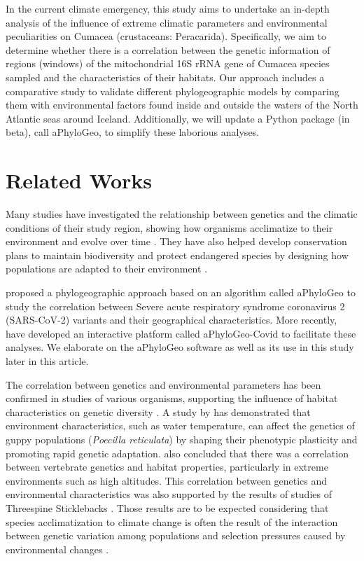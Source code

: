 In the current climate emergency, this study aims to undertake an in-depth analysis of the influence of extreme climatic parameters and environmental peculiarities on Cumacea (crustaceans: Peracarida). Specifically, we aim to determine whether there is a correlation between the genetic information of regions (windows) of the mitochondrial 16S rRNA gene of Cumacea species sampled and the characteristics of their habitats. Our approach includes a comparative study to validate different phylogeographic models by comparing them with environmental factors found inside and outside the waters of the North Atlantic seas around Iceland. Additionally, we will update a Python package (in beta), call aPhyloGeo, to simplify these laborious analyses.

\section{Related Works}\label{related-works}
Many studies have investigated the relationship between genetics and the climatic conditions of their study region, showing how organisms acclimatize to their environment and evolve over time \citep{fc_genomic_2012}. They have also helped develop conservation plans to maintain biodiversity and protect endangered species by designing how populations are adapted to their environment \citep{balkenhol_identifying_2009}.

\cite{koshkarov_phylogeography_2022} proposed a phylogeographic approach based on an algorithm called aPhyloGeo to study the correlation between Severe acute respiratory syndrome coronavirus 2 (SARS-CoV-2) variants and their geographical characteristics. More recently, \cite{li_aphylogeo-covid_2023} have developed an interactive platform called aPhyloGeo-Covid to facilitate these analyses.  We elaborate on the aPhyloGeo software as well as its use in this study later in this article.

The correlation between genetics and environmental parameters has been confirmed in studies of various organisms, supporting the influence of habitat characteristics on genetic diversity \citep{colosimo_widespread_2005,cheviron_genomic_2012}. A study by \cite{ghalambor_adaptive_2007} has demonstrated that environment characteristics, such as water temperature, can affect the genetics of guppy populations (\emph{Poecilla reticulata}) by shaping their phenotypic plasticity and promoting rapid genetic adaptation. \cite{cheviron_genomic_2012} also concluded that there was a correlation between vertebrate genetics and habitat properties, particularly in extreme environments such as high altitudes. This correlation between genetics and environmental characteristics was also supported by the results of studies of Threespine Sticklebacks \citep{colosimo_widespread_2005}. Those results are to be expected considering that species acclimatization to climate change is often the result of the interaction between genetic variation among populations and selection pressures caused by environmental changes \citep{hoffmann_climate_2011}.


